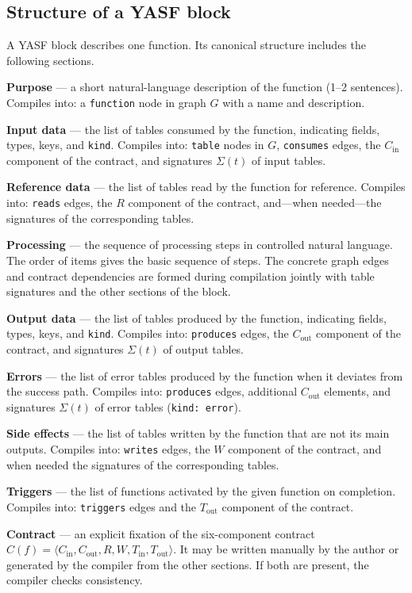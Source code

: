 \subsection{Structure of a YASF block}

A YASF block describes one function. Its canonical structure includes the following sections.

\textbf{Purpose} --- a short natural-language description of the function (1--2 sentences). Compiles into: a \texttt{function} node in graph $G$ with a name and description.

\textbf{Input data} --- the list of tables consumed by the function, indicating fields, types, keys, and \texttt{kind}. Compiles into: \texttt{table} nodes in $G$, \texttt{consumes} edges, the $C_{\mathrm{in}}$ component of the contract, and signatures $\Sigma(t)$ of input tables.

\textbf{Reference data} --- the list of tables read by the function for reference. Compiles into: \texttt{reads} edges, the $R$ component of the contract, and---when needed---the signatures of the corresponding tables.

\textbf{Processing} --- the sequence of processing steps in controlled natural language. The order of items gives the basic sequence of steps. The concrete graph edges and contract dependencies are formed during compilation jointly with table signatures and the other sections of the block.

\textbf{Output data} --- the list of tables produced by the function, indicating fields, types, keys, and \texttt{kind}. Compiles into: \texttt{produces} edges, the $C_{\mathrm{out}}$ component of the contract, and signatures $\Sigma(t)$ of output tables.

\textbf{Errors} --- the list of error tables produced by the function when it deviates from the success path. Compiles into: \texttt{produces} edges, additional $C_{\mathrm{out}}$ elements, and signatures $\Sigma(t)$ of error tables (\texttt{kind: error}).

\textbf{Side effects} --- the list of tables written by the function that are not its main outputs. Compiles into: \texttt{writes} edges, the $W$ component of the contract, and when needed the signatures of the corresponding tables.

\textbf{Triggers} --- the list of functions activated by the given function on completion. Compiles into: \texttt{triggers} edges and the $T_{\mathrm{out}}$ component of the contract.

\textbf{Contract} --- an explicit fixation of the six-component contract $C(f) = \langle C_{\mathrm{in}}, C_{\mathrm{out}}, R, W, T_{\mathrm{in}}, T_{\mathrm{out}} \rangle$. It may be written manually by the author or generated by the compiler from the other sections. If both are present, the compiler checks consistency.


